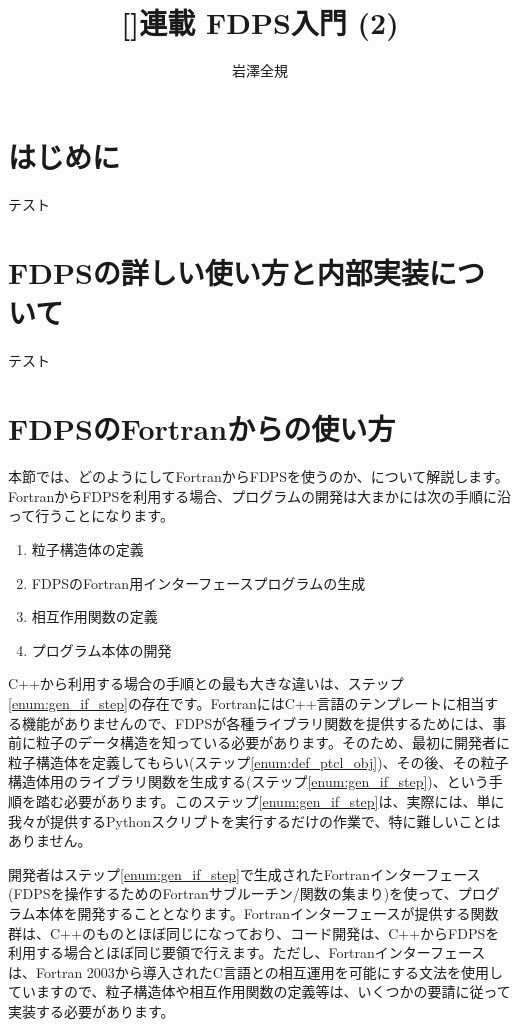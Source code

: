 \documentclass[twocolumn,10pt]{jarticle}
\title{%
[]連載 FDPS入門 (2) 
}
\author{%
岩澤全規
}
\affiliation{%
理化学研究所\quad 計算科学研究機構
}
\begin{document}
\maketitle

\section{はじめに}
テスト\\

\section{FDPSの詳しい使い方と内部実装について}
テスト\\

\section{FDPSのFortranからの使い方}\label{sec:usage_of_fdps_from_ftn}
本節では、どのようにしてFortranからFDPSを使うのか、について解説します。FortranからFDPSを利用する場合、プログラムの開発は大まかには次の手順に沿って行うことになります。
\begin{enumerate}
\item 粒子構造体の定義 \label{enum:def_ptcl_obj}
\item FDPSのFortran用インターフェースプログラムの生成 \label{enum:gen_if_step}
\item 相互作用関数の定義 \label{enum:def_interact_func}
\item プログラム本体の開発
\end{enumerate}
C++から利用する場合の手順との最も大きな違いは、ステップ\ref{enum:gen_if_step}の存在です。FortranにはC++言語のテンプレートに相当する機能がありませんので、FDPSが各種ライブラリ関数を提供するためには、事前に粒子のデータ構造を知っている必要があります。そのため、最初に開発者に粒子構造体を定義してもらい(ステップ\ref{enum:def_ptcl_obj})、その後、その粒子構造体用のライブラリ関数を生成する(ステップ\ref{enum:gen_if_step})、という手順を踏む必要があります。このステップ\ref{enum:gen_if_step}は、実際には、単に我々が提供するPythonスクリプトを実行するだけの作業で、特に難しいことはありません。

開発者はステップ\ref{enum:gen_if_step}で生成されたFortranインターフェース(FDPSを操作するためのFortranサブルーチン/関数の集まり)を使って、プログラム本体を開発することとなります。Fortranインターフェースが提供する関数群は、C++のものとほぼ同じになっており、コード開発は、C++からFDPSを利用する場合とほぼ同じ要領で行えます。ただし、Fortranインターフェースは、Fortran 2003から導入されたC言語との相互運用を可能にする文法を使用していますので、粒子構造体や相互作用関数の定義等は、いくつかの要請に従って実装する必要があります。
\end{document}
